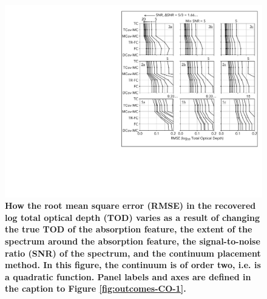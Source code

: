 \documentclass[trackchanges]{aastex62}
\begin{document}
{\begin{figure}
  \includegraphics[width=\linewidth]{figures/annotated_co2_RMSEs_vs_SNR.pdf}
  \caption{
  \bf \color{red}
  How the root mean square error (RMSE) in the recovered log total optical depth (TOD) varies as a result of changing the true TOD of the absorption feature, the extent of the spectrum around the absorption feature, the signal-to-noise ratio (SNR) of the spectrum, and the continuum placement method.
  In this figure, the continuum is of order two, i.e. is a quadratic function.
  Panel labels and axes are defined in the caption to Figure \ref{fig:outcomes-CO-1}.
  }
  \label{fig:outcomes-CO-2}
\end{figure}

}
\end{document}

